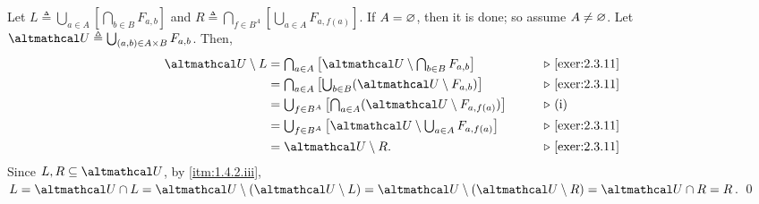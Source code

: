 \documentclass[../introduction_to_set_theory_Note.tex]{subfiles}
\begin{document}
{\begin{enumerate}[nolistsep, label=(\roman*), leftmargin=*, listparindent=\parindent]
    \ii
    Let \(L \triangleq \bigcup_{a \in A} \left[\bigcap_{b \in B} F_{a, b}\right]\)
    and \(R \triangleq \bigcap_{f \in B^A} \left[\bigcup_{a \in A} F_{a, f(a)}\right]\).
    If \(A = \varnothing\), then it is done; so assume \(A \neq \varnothing\).
    Let \(\mcal{U} \triangleq \bigcup_{(a, b) \in A \times B} F_{a, b}\).
    Then,
    \begin{alignat*}{2}
        \mcal{U} \setminus L
        &= \textstyle \bigcap_{a \in A} \left[ \mcal{U} \setminus \bigcap_{b \in B} F_{a, b} \right]
        &\qquad& \comment*{\Cref{exer:2.3.11}} \\
        &= \textstyle \bigcap_{a \in A} \left[ \bigcup_{b \in B} (\mcal{U} \setminus F_{a, b}) \right]
        &\qquad& \comment*{\Cref{exer:2.3.11}} \\
        &= \textstyle \bigcup_{f \in B^A} \left[ \bigcap_{a \in A} (\mcal{U} \setminus F_{a, f(a)}) \right]
        && \comment*{(i)} \\
        &= \textstyle \bigcup_{f \in B^A} \left[ \mcal{U} \setminus \bigcup_{a \in A} F_{a, f(a)} \right]
        &\qquad& \comment*{\Cref{exer:2.3.11}} \\
        &= \textstyle \mcal{U} \setminus R.
        &\qquad& \comment*{\Cref{exer:2.3.11}}
    \end{alignat*}
    Since \(L, R \subseteq \mcal{U}\), by \ref{itm:1.4.2.iii},
    \(L = \mcal{U} \cap L = \mcal{U} \setminus (\mcal{U} \setminus L)
    = \mcal{U} \setminus (\mcal{U} \setminus R)
    = \mcal{U} \cap R = R\).
    \qed
\end{enumerate}
}
\end{document}

